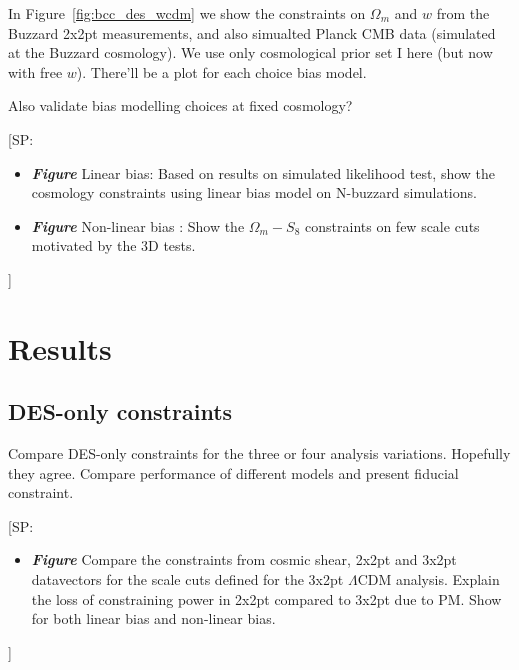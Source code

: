 \documentclass[fleqn,usenatbib]{mnras}
\newcommand\fig[1]{Figure~\ref{#1}}
\newcommand{\SP}[1]{{\color{red}[SP: #1]}}
\begin{document}
In \fig{fig:bcc_des_wcdm} we show the constraints on $\Omega_m$ and $w$ from the Buzzard 2x2pt measurements, and also simualted Planck CMB data (simulated at the Buzzard cosmology). We use only cosmological prior set I here (but now with free $w$). There'll be a plot for each choice bias model.

Also validate bias modelling choices at fixed cosmology?

\SP{
\begin{itemize}
    \item \textbf{\textit{Figure}} Linear bias: Based on results on simulated likelihood test, show the cosmology constraints using linear bias model on N-buzzard simulations. 
    \item \textbf{\textit{Figure}} Non-linear bias : Show the $\Omega_m - S_8$ constraints on few scale cuts motivated by the 3D tests. 
\end{itemize}
}



\section{Results}

\subsection{DES-only constraints}

Compare DES-only constraints for the three or four analysis variations. Hopefully they agree. Compare performance of different models and present fiducial constraint.

\SP{\begin{itemize}
    \item \textbf{\textit{Figure}} Compare the constraints from cosmic shear, 2x2pt and 3x2pt datavectors for the scale cuts defined for the 3x2pt $\Lambda$CDM analysis. Explain the loss of constraining power in 2x2pt compared to 3x2pt due to PM. Show for both linear bias and non-linear bias. 
\end{itemize}
}
\end{document}
